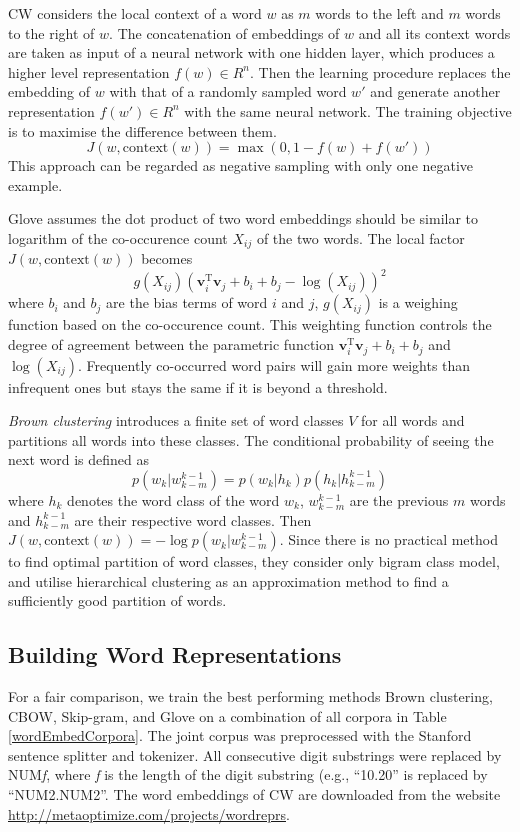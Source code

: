 CW considers the local context of a word $w$ as $m$ words to the left and $m$ words to the right of $w$. The concatenation of embeddings of $w$ and all its context words are taken as input of a neural network with one hidden layer, which produces a higher level representation $f(w) \in R^n$. Then the learning procedure replaces the embedding of $w$ with that of a randomly sampled word $w'$ and generate another representation $f(w') \in R^n$ with the same neural network. The training objective is to maximise the difference between them.
\begin{equation}
J(w, \text{context}(w)) = \max (0, 1 - f(w) + f(w'))
\end{equation}
This approach can be regarded as negative sampling with only one negative example.

Glove assumes the dot product of two word embeddings should be similar to logarithm of the co-occurence count $X_{ij}$ of the two words. The local factor $J(w, \text{context}(w))$ becomes
\begin{equation}
g(X_{ij}) (\mathbf{v}_i^{\text{T}} \mathbf{v}_j + b_i + b_j - \log(X_{ij}))^2
\end{equation}
where $b_i$ and $b_j$ are the bias terms of word $i$ and $j$, $g(X_{ij})$ is a weighing function based on the co-occurence count. This weighting function controls the degree of agreement between the parametric function $\mathbf{v}_i^{\text{T}} \mathbf{v}_j + b_i + b_j $ and $\log(X_{ij})$. Frequently co-occurred word pairs will gain more weights than infrequent ones but stays the same if it is beyond a threshold.

\textit{Brown clustering} introduces a finite set of word classes $V$ for all words and partitions all words into these classes. The conditional probability of seeing the next word is defined as
\begin{equation}
p(w_k | w_{k - m}^{k -1}) = p(w_k | h_k) p(h_k | h_{k - m}^{k -1})
\end{equation}
where $h_k$ denotes the word class of the word $w_k$, $w_{k - m}^{k -1}$ are the previous $m$ words and $h_{k - m}^{k -1}$ are their respective word classes. Then $J(w, \text{context}(w)) = - \log p(w_k | w_{k - m}^{k -1}) $. Since there is no practical method to find optimal partition of word classes, they consider only bigram class model, and utilise hierarchical clustering as an approximation method to find a sufficiently good partition of words. 

\subsection{Building Word Representations}
\label{buildingWordRep}
For a fair comparison, we train the best performing methods Brown clustering, CBOW, Skip-gram, and Glove on a combination of all corpora in Table \ref{wordEmbedCorpora}. The joint corpus was preprocessed with the Stanford sentence splitter and tokenizer. All consecutive digit substrings were replaced by NUM\textit{f}, where \textit{f} is the length of the digit substring (e.g., ``10.20'' is replaced by ``NUM2.NUM2''. The word embeddings of CW are downloaded from the website \url{http://metaoptimize.com/projects/wordreprs}.

